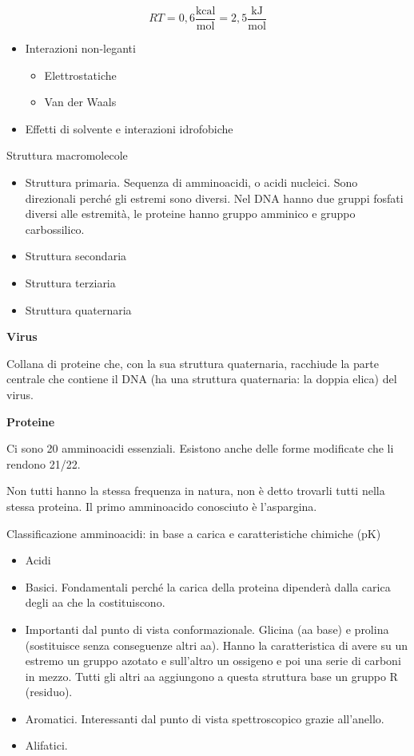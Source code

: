 \[RT = 0,6\frac{\text{kcal}}{\text{mol}} = 2,5\frac{\text{kJ}}{\text{mol}}\]

\begin{itemize}
\item
  Interazioni non-leganti

  \begin{itemize}
  \item
    Elettrostatiche
  \item
    Van der Waals
  \end{itemize}
\item
  Effetti di solvente e interazioni idrofobiche
\end{itemize}

Struttura macromolecole

\begin{itemize}
\item
  Struttura primaria. Sequenza di amminoacidi, o acidi nucleici. Sono
  direzionali perché gli estremi sono diversi. Nel DNA hanno due gruppi
  fosfati diversi alle estremità, le proteine hanno gruppo amminico e
  gruppo carbossilico.
\item
  Struttura secondaria
\item
  Struttura terziaria
\item
  Struttura quaternaria
\end{itemize}

\textbf{Virus }

Collana di proteine che, con la sua struttura quaternaria, racchiude la
parte centrale che contiene il DNA (ha una struttura quaternaria: la
doppia elica) del virus.

\textbf{Proteine }

Ci sono 20 amminoacidi essenziali. Esistono anche delle forme modificate
che li rendono 21/22.

Non tutti hanno la stessa frequenza in natura, non è detto trovarli
tutti nella stessa proteina. Il primo amminoacido conosciuto è
l'aspargina.

Classificazione amminoacidi: in base a carica e caratteristiche chimiche
(pK)

\begin{itemize}
\item
  Acidi
\item
  Basici. Fondamentali perché la carica della proteina dipenderà dalla
  carica degli aa che la costituiscono.
\item
  Importanti dal punto di vista conformazionale. Glicina (aa base) e
  prolina (sostituisce senza conseguenze altri aa). Hanno la
  caratteristica di avere su un estremo un gruppo azotato e sull'altro
  un ossigeno e poi una serie di carboni in mezzo. Tutti gli altri aa
  aggiungono a questa struttura base un gruppo R (residuo).
\item
  Aromatici. Interessanti dal punto di vista spettroscopico grazie
  all'anello.
\item
  Alifatici.
\end{itemize}


